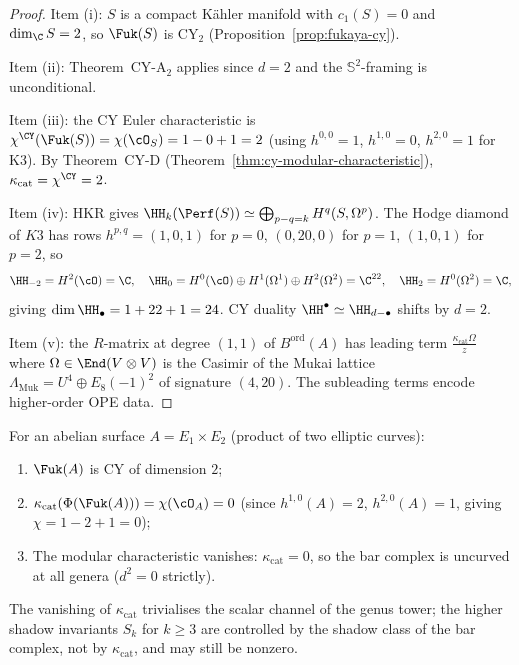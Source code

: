 \begin{proof}
Item (i): $S$ is a compact K\"ahler manifold with $c_1(S) = 0$ and
$\dim_\C S = 2$, so $\Fuk(S)$ is CY$_2$
(Proposition~\ref{prop:fukaya-cy}).

Item (ii): Theorem~CY-A$_2$ applies since $d = 2$ and the
$\mathbb{S}^2$-framing is unconditional.

Item (iii): the CY Euler characteristic is
$\chi^{\CY}(\Fuk(S)) = \chi(\cO_S) = 1 - 0 + 1 = 2$ (using
$h^{0,0} = 1$, $h^{1,0} = 0$, $h^{2,0} = 1$ for K3). By
Theorem~CY-D (Theorem~\ref{thm:cy-modular-characteristic}),
$\kappa_{\mathrm{cat}} = \chi^{\CY} = 2$.

Item (iv): HKR gives
$\HH_k(\Perf(S)) \simeq \bigoplus_{p-q=k} H^q(S, \Omega^p)$.
The Hodge diamond of $K3$ has rows
$h^{p,q} = (1,0,1)$ for $p=0$, $(0,20,0)$ for $p=1$,
$(1,0,1)$ for $p=2$, so
\[
 \HH_{-2} = H^2(\cO) = \C, \quad
 \HH_0 = H^0(\cO) \oplus H^1(\Omega^1) \oplus H^2(\Omega^2) = \C^{22}, \quad
 \HH_2 = H^0(\Omega^2) = \C,
\]
giving $\dim \HH_\bullet = 1 + 22 + 1 = 24$. CY duality
$\HH^\bullet \simeq \HH_{d-\bullet}$ shifts by $d = 2$.

Item (v): the $R$-matrix at degree $(1,1)$ of $B^{\mathrm{ord}}(A)$
has leading term $\frac{\kappa_{\mathrm{cat}}\Omega}{z}$ where
$\Omega \in \End(V \otimes V)$ is the Casimir of the Mukai lattice
$\Lambda_{\mathrm{Muk}} = U^4 \oplus E_8(-1)^2$ of signature $(4,20)$.
The subleading terms encode higher-order OPE data.
\end{proof}

\begin{example}
\label{ex:fukaya-abelian-surface}
For an abelian surface $A = E_1 \times E_2$ (product of two
elliptic curves):
\begin{enumerate}[label=(\roman*)]
 \item $\Fuk(A)$ is CY of dimension $2$;
 \item $\kappa_{\mathrm{cat}}(\Phi(\Fuk(A)))
 = \chi(\cO_A) = 0$ (since $h^{1,0}(A) = 2$,
 $h^{2,0}(A) = 1$, giving $\chi = 1 - 2 + 1 = 0$);
 \item The modular characteristic vanishes:
 $\kappa_{\mathrm{cat}} = 0$, so the bar complex is uncurved
 at all genera ($d^2 = 0$ strictly).
\end{enumerate}
The vanishing of $\kappa_{\mathrm{cat}}$ trivialises the scalar
channel of the genus tower; the higher shadow invariants
$S_k$ for $k \geq 3$ are controlled by the shadow class of the
bar complex, not by $\kappa_{\mathrm{cat}}$, and may still be
nonzero.
\end{example}


